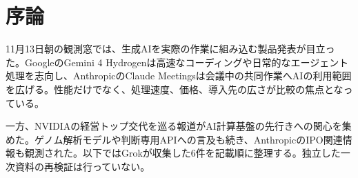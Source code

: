 \section{序論}
11月13日朝の観測窓では、生成AIを実際の作業に組み込む製品発表が目立った。GoogleのGemini 4 Hydrogenは高速なコーディングや日常的なエージェント処理を志向し、AnthropicのClaude Meetingsは会議中の共同作業へAIの利用範囲を広げる。性能だけでなく、処理速度、価格、導入先の広さが比較の焦点となっている。

一方、NVIDIAの経営トップ交代を巡る報道がAI計算基盤の先行きへの関心を集めた。ゲノム解析モデルや判断専用APIへの言及も続き、AnthropicのIPO関連情報も観測された。以下ではGrokが収集した6件を記載順に整理する。独立した一次資料の再検証は行っていない。